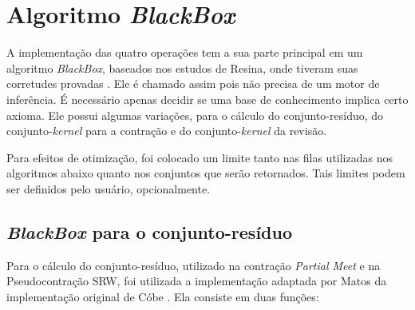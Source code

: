 \section{Algoritmo \textit{BlackBox}}

A implementação das quatro operações tem a sua parte principal em um algoritmo \textit{BlackBox}, baseados nos estudos de Resina, onde tiveram suas corretudes provadas \citep{logicaResina}. Ele é chamado assim pois não precisa de um motor de inferência. É necessário apenas decidir se uma base de conhecimento implica certo axioma. Ele possui algumas variações, para o cálculo do conjunto-resíduo, do conjunto-\textit{kernel} para a contração e do conjunto-\textit{kernel} da revisão.

Para efeitos de otimização, foi colocado um limite tanto nas filas utilizadas nos algoritmos abaixo quanto nos conjuntos que serão retornados. Tais limites podem ser definidos pelo usuário, opcionalmente.

\subsection{\textit{BlackBox} para o conjunto-resíduo}

Para o cálculo do conjunto-resíduo, utilizado na contração \textit{Partial Meet} e na Pseudocontração SRW, foi utilizada a implementação adaptada por Matos da implementação original de Cóbe \citep{logicaMatos}. Ela consiste em duas funções:

